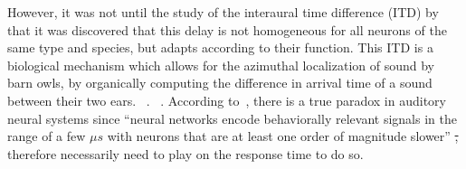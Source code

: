 \documentclass[brainsci, %
               review,accept,pdftex,moreauthors %
               ]{Definitions/mdpi}
\providecommand{\DIFadd}[1]{{\protect\color{blue}\uwave{#1}}} %
\providecommand{\DIFdel}[1]{{\protect\color{red}\sout{#1}}}                      %
\providecommand{\DIFaddbegin}{} %
\providecommand{\DIFaddend}{} %
\providecommand{\DIFdelbegin}{} %
\providecommand{\DIFdelend}{} %
\newcommand{\DIFscaledelfig}{0.5}
\newlength{\DIFdelgraphicswidth} %
\newlength{\DIFdelgraphicsheight} %
\newcommand{\DIFaddincludegraphics}[2][]{{\color{blue}\fbox{\DIFOincludegraphics[#1]{#2}}}} %
\newcommand{\DIFdelincludegraphics}[2][]{%
\sbox{\DIFdelgraphicsbox}{\DIFOincludegraphics[#1]{#2}}%
\settoboxwidth{\DIFdelgraphicswidth}{\DIFdelgraphicsbox} %
\settoboxtotalheight{\DIFdelgraphicsheight}{\DIFdelgraphicsbox} %
\scalebox{\DIFscaledelfig}{%
\parbox[b]{\DIFdelgraphicswidth}{\usebox{\DIFdelgraphicsbox}\\[-\baselineskip] \rule{\DIFdelgraphicswidth}{0em}}\llap{\resizebox{\DIFdelgraphicswidth}{\DIFdelgraphicsheight}{%
\setlength{\unitlength}{\DIFdelgraphicswidth}%
\begin{picture}(1,1)%
\thicklines\linethickness{2pt} %
{\color[rgb]{1,0,0}\put(0,0){\framebox(1,1){}}}%
{\color[rgb]{1,0,0}\put(0,0){\line( 1,1){1}}}%
{\color[rgb]{1,0,0}\put(0,1){\line(1,-1){1}}}%
\end{picture}%
}\hspace*{3pt}}} %
} %
\DeclareRobustCommand{\DIFaddbegin}{\DIFOaddbegin \let\includegraphics\DIFaddincludegraphics} %
\DeclareRobustCommand{\DIFaddend}{\DIFOaddend \let\includegraphics\DIFOincludegraphics} %
\DeclareRobustCommand{\DIFdelbegin}{\DIFOdelbegin \let\includegraphics\DIFdelincludegraphics} %
\DeclareRobustCommand{\DIFdelend}{\DIFOaddend \let\includegraphics\DIFOincludegraphics} %
\begin{document}
However, it was not until the study of the interaural time difference (ITD) by ~\citet{carr_circuit_1990} that it was discovered that this delay is not homogeneous for all neurons of the same type and species, but adapts according to their function. This ITD is a biological mechanism which allows for the azimuthal localization of sound by barn owls, by organically computing the difference in arrival time of a sound between their two ears. \DIFdelbegin %
\DIFdelend \DIFaddbegin {}\DIFaddend ~\citep{jeffress_place_1948}. \DIFdelbegin %
\DIFdelend \DIFaddbegin {}\DIFaddend ~\citep{konishi_coding_2003}. According to~\citep{gerstner_neuronal_1996}, there is a true paradox in auditory neural systems since ``neural networks encode behaviorally relevant signals in the range of a few $\mu s$ with neurons that are at least one order of magnitude slower'' \DIFdelbegin \DIFdel{, }\DIFdelend \DIFaddbegin \DIFadd{and }\DIFaddend therefore necessarily need to play on the response time to do so. \DIFdelbegin %
\end{document}
